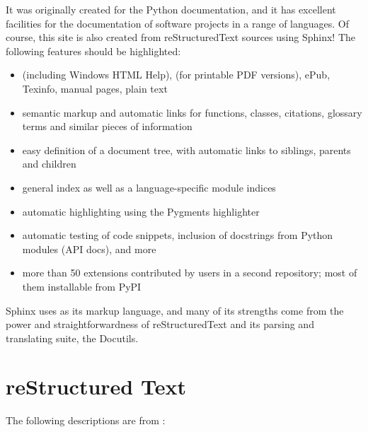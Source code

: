 \documentclass[letterpaper,11pt,english]{sphinxmanual}
\begin{document}
It was originally created for the Python documentation, and it has excellent facilities for the documentation of software projects in a range of languages. Of course, this site is also created from reStructuredText sources using Sphinx! The following features should be highlighted:
\begin{itemize}
\item {} 
  (including Windows HTML Help),  (for printable PDF versions), ePub, Texinfo, manual pages, plain text

\item {} 
 semantic markup and automatic links for functions, classes, citations, glossary terms and similar pieces of information

\item {} 
 easy definition of a document tree, with automatic links to siblings, parents and children

\item {} 
 general index as well as a language-specific module indices

\item {} 
 automatic highlighting using the Pygments highlighter

\item {} 
 automatic testing of code snippets, inclusion of docstrings from Python modules (API docs), and more

\item {} 
 more than 50 extensions contributed by users in a second repository; most of them installable from PyPI

\end{itemize}

Sphinx uses  as its markup language, and many of its strengths come from the power and straightforwardness of reStructuredText and its parsing and translating suite, the Docutils.


\section{reStructured Text}
\label{\detokenize{intro:restructured-text}}
The following descriptions are from :
\end{document}
